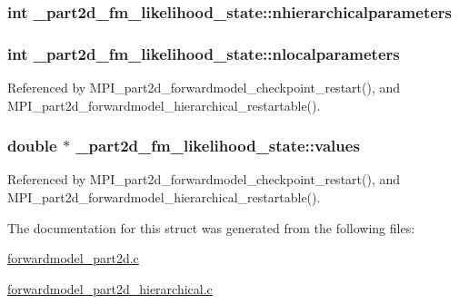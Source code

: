 \subsubsection[{\texorpdfstring{nhierarchicalparameters}{nhierarchicalparameters}}]{\setlength{\rightskip}{0pt plus 5cm}int \+\_\+part2d\+\_\+fm\+\_\+likelihood\+\_\+state\+::nhierarchicalparameters}\hypertarget{struct__part2d__fm__likelihood__state_a8ac576395a4ad97424e8f0c74c423c82}{}\label{struct__part2d__fm__likelihood__state_a8ac576395a4ad97424e8f0c74c423c82}
\subsubsection[{\texorpdfstring{nlocalparameters}{nlocalparameters}}]{\setlength{\rightskip}{0pt plus 5cm}int \+\_\+part2d\+\_\+fm\+\_\+likelihood\+\_\+state\+::nlocalparameters}\hypertarget{struct__part2d__fm__likelihood__state_a8553534c5dbc507802ec421b220e9588}{}\label{struct__part2d__fm__likelihood__state_a8553534c5dbc507802ec421b220e9588}


Referenced by M\+P\+I\+\_\+part2d\+\_\+forwardmodel\+\_\+checkpoint\+\_\+restart(), and M\+P\+I\+\_\+part2d\+\_\+forwardmodel\+\_\+hierarchical\+\_\+restartable().

\subsubsection[{\texorpdfstring{values}{values}}]{\setlength{\rightskip}{0pt plus 5cm}double $\ast$ \+\_\+part2d\+\_\+fm\+\_\+likelihood\+\_\+state\+::values}\hypertarget{struct__part2d__fm__likelihood__state_a7bd797c6f8fce53adba2e31d6845612f}{}\label{struct__part2d__fm__likelihood__state_a7bd797c6f8fce53adba2e31d6845612f}


Referenced by M\+P\+I\+\_\+part2d\+\_\+forwardmodel\+\_\+checkpoint\+\_\+restart(), and M\+P\+I\+\_\+part2d\+\_\+forwardmodel\+\_\+hierarchical\+\_\+restartable().



The documentation for this struct was generated from the following files\+:\begin{DoxyCompactItemize}
\item 
\hyperlink{forwardmodel__part2d_8c}{forwardmodel\+\_\+part2d.\+c}\item 
\hyperlink{forwardmodel__part2d__hierarchical_8c}{forwardmodel\+\_\+part2d\+\_\+hierarchical.\+c}\end{DoxyCompactItemize}
